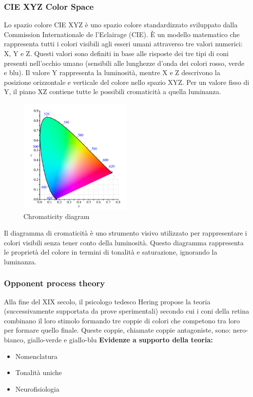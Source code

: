 \subsubsection{CIE XYZ Color Space}

Lo spazio colore CIE XYZ è uno spazio colore standardizzato sviluppato dalla Commission Internationale de l'Eclairage (CIE). È un modello matematico che rappresenta tutti i colori visibili agli esseri umani attraverso tre valori numerici: X, Y e Z.
Questi valori sono definiti in base alle risposte dei tre tipi di coni presenti nell'occhio umano (sensibili alle lunghezze d'onda dei colori rosso, verde e blu).
Il valore Y rappresenta la luminosità, mentre X e Z descrivono la posizione orizzontale e verticale del colore nello spazio XYZ.
Per un valore fisso di Y, il piano XZ contiene tutte le possibili cromaticità a quella luminanza.
\begin{figure}[H]
    \centering
    \includegraphics[width=0.5\textwidth]{images/Chromaticity diagram.png} 
    \caption{Chromaticity diagram}
    \label{fig:immagine}
\end{figure}
Il diagramma di cromaticità è uno strumento visivo utilizzato per rappresentare i colori visibili senza tener conto della luminosità. Questo diagramma rappresenta le proprietà del colore in termini di tonalità e saturazione, ignorando la luminanza.

\subsubsection{Opponent process theory}

Alla fine del XIX secolo, il psicologo tedesco Hering propose la teoria (successivamente supportata da prove sperimentali) secondo cui i coni della retina combinano il loro stimolo formando tre coppie di colori che competono tra loro per formare quello finale. Queste coppie, chiamate coppie antagoniste, sono: nero-bianco, giallo-verde e giallo-blu
\textbf{Evidenze a supporto della teoria:}
\begin{itemize}
  \item Nomenclatura
  \item Tonalità uniche
  \item Neurofisiologia
\end{itemize}

